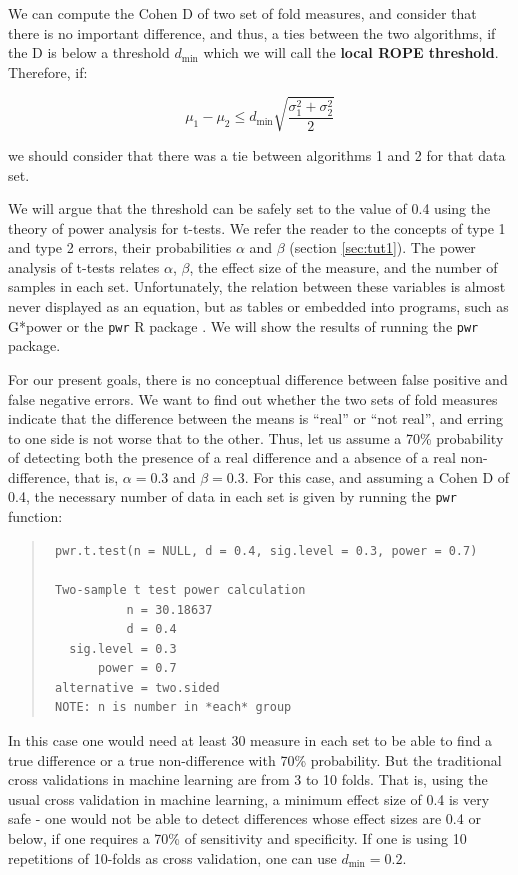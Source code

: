 \documentclass[twoside,11pt,preprint]{article}
\begin{document}
We can compute the Cohen D of two set of fold measures, and consider
that there is no important difference, and thus, a ties between the two
algorithms, if the D is below a threshold \(d_{\min}\) which we will
call the \textbf{local ROPE threshold}. Therefore, if:

\begin{equation} \label{eq:dmin}
\mu_1 - \mu_2 \le d_{\min} \sqrt{\frac{\sigma_1^2 + \sigma_2^2}{2}} 
\end{equation}

we should consider that there was a tie between algorithms 1 and 2 for that data set.

We will argue that the threshold can be safely set to the value of 0.4
using the theory of power analysis for t-tests. We refer the reader to the concepts of type 1 and type 2 errors, their probabilities \(\alpha\) and \(\beta\) (section \ref{sec:tut1}).
The power analysis of t-tests relates \(\alpha\), \(\beta\), the effect
size of the measure, and the number of samples in each set.
Unfortunately, the relation between these variables is almost never
displayed as an equation, but as tables \citep[ch.~2]{cohen1988statistical}
or embedded into programs, such as G*power \citep{faul2007g} or
the \texttt{pwr} R package \citep{pwrR}. We will show the results of running the
\texttt{pwr} package.

For our present goals, there is no conceptual difference
between false positive and false negative errors. We want to find out
whether the two sets of fold measures indicate that the difference
between the means is ``real'' or ``not real'', and erring to one side is
not worse that to the other. Thus, let us assume a 70\% probability of
detecting both the presence of a real difference and a absence of a
real non-difference, that is, \(\alpha = 0.3\) and \(\beta = 0.3\). For
this case, and assuming a Cohen D of 0.4, the necessary number of data
in each set is given by running the \texttt{pwr} function:

\begin{quote}
\begin{verbatim}
 pwr.t.test(n = NULL, d = 0.4, sig.level = 0.3, power = 0.7)

 Two-sample t test power calculation 
           n = 30.18637
           d = 0.4
   sig.level = 0.3
       power = 0.7
 alternative = two.sided
 NOTE: n is number in *each* group
\end{verbatim}
\end{quote}

In this case one would need at least 30 measure in each set to be able
to find a true difference or a true non-difference with 70\%
probability. But the traditional cross validations in machine
learning are from 3 to 10 folds. That is, using the usual cross
validation in machine learning, a minimum effect size of 0.4 is very
safe - one would not be able to detect differences whose effect sizes
are 0.4 or below, if one requires a 70\% of sensitivity and
specificity. If one is using 10 repetitions of 10-folds as cross
validation, one can use \(d_{\min} = 0.2\).
\end{document}
